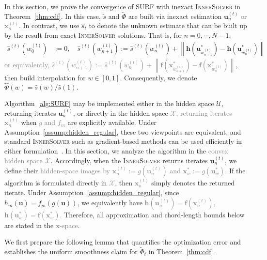 \documentclass{article}
\newcommand{\bx}{\mathbf{x}}
\newcommand{\bu}{\mathbf{u}}
\newcommand{\X}{\mathcal{X}}
\newcommand{\U}{\mathcal{U}}
\newcommand{\f}{\mathbf{f}}
\newcommand{\h}{\mathbf{h}}
\newcommand{\Farc}{\Phi}
\begin{document}
In this section, we prove the convergence of SURF with inexact \textsc{InnerSolver} in Theorem~\ref{thm:cdf}. In this case, $\tilde s$ and $\tilde \Farc$ are built via inexact estimation $\bu_{n}^{(t)}$ \textcolor{gray}{or $\bx_{n}^{(t)}$}.
In contrast, we use $\hat s_t$ to denote the unknown estimate that can be built up by the result from exact \textsc{InnerSolver} solutions. That is, for $n=0,\cdots,N-1$, 
\begin{align}
\hat s^{(t)}(w_0^{(t)})&:=0,\quad
\hat s^{(t)}(w_{n+1}^{(t)}):=
\hat s^{(t)}(w_n^{(t)})
+
\left\|
\h\left(\bu_{w_{n+1}^{(t)}}^*\right)-\h\left(\bu_{w_{n}^{(t)}}^*\right)
\right\|
\label{eq:sw_tilde_exact}
\end{align}
\textcolor{gray}{or equivalently, $\hat s^{(t)}(w_{n+1}^{(t)}):=
\hat s^{(t)}(w_n^{(t)})
+
\left\|
\f\left(\bx_{w_{n+1}^{(t)}}^*\right)-\f\left(\bx_{w_{n}^{(t)}}^*\right)
\right\|$}, then build interpolation for $w\in[0,1]$. Consequently, we denote $\hat \Farc(w)= \hat s(w)/\hat s(1)$.

Algorithm~\ref{alg:SURF} may be implemented either in the hidden space $\U$, returning iterates $\bu_n^{(t)}$, or directly in the hidden space \textcolor{gray}{$\X$, returning iterates $\bx_n^{(t)}$} when \textcolor{gray}{$g$ and $f_m$} are explicitly available. Under Assumption~\ref{assump:hidden_regular}, these two viewpoints are equivalent, and standard \textsc{InnerSolver} such as gradient-based methods can be used efficiently in either formulation~\citep{fatkhullin2025stochastic}.
In this section, we analyze the algorithm in the \textcolor{gray}{convex hidden space $\X$}. Accordingly, when the \textsc{InnerSolver} returns iterates $\bu_n^{(t)}$, we define their \textcolor{gray}{hidden-space images by $\bx_n^{(t)}:=g(\bu_n^{(t)})$ and $\bx_w^*:=g(\bu_w^*)$}.
If the algorithm is formulated directly in \textcolor{gray}{$\X$}, then \textcolor{gray}{$\bx_n^{(t)}$} simply denotes the returned iterate.
Under Assumption~\ref{assump:hidden_regular}, since $h_m(\bu)=f_m(g(\bu))$, we equivalently have \textcolor{gray}{$\mathbf h(\bu_n^{(t)})=\f(\bx_n^{(t)})$, $\mathbf h(\bu_w^*)=\f(\bx_w^*)$.}
Therefore, all approximation and chord-length bounds below are stated in the \textcolor{gray}{$\bx$-space}.


We first prepare the following lemma that quantifies the optimization error and establishes the uniform smoothness claim for $\tilde\Farc_t$ in Theorem~\ref{thm:cdf}.
\end{document}
